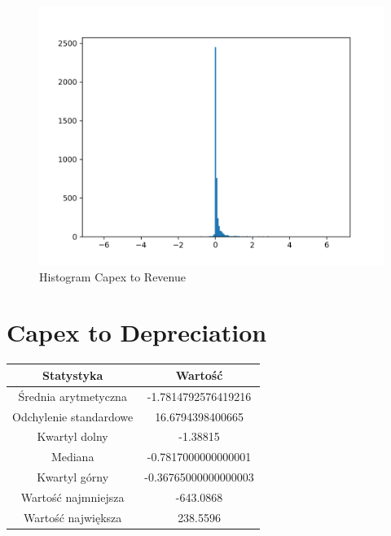 \documentclass{article}
\begin{document}
\begin{figure}[h!]
    \includegraphics[width=\linewidth]{variables/Capex to Revenue.png}
    \caption{Histogram Capex to Revenue }
\end{figure}\section{ Capex to Depreciation }

\begin{center}
    \begin{tabular}{|c | c|} 
    \hline
    Statystyka & Wartość \\
    \hline\hline
    Średnia arytmetyczna & -1.7814792576419216 \\ 
    \hline
    Odchylenie standardowe & 16.6794398400665 \\
    \hline
    Kwartyl dolny & -1.38815 \\
    \hline
    Mediana & -0.7817000000000001 \\
    \hline
    Kwartyl górny & -0.36765000000000003 \\
    \hline
    Wartość najmniejsza & -643.0868 \\
    \hline
    Wartość największa & 238.5596 \\
    \hline
   \end{tabular}
\end{center}
\end{document}
